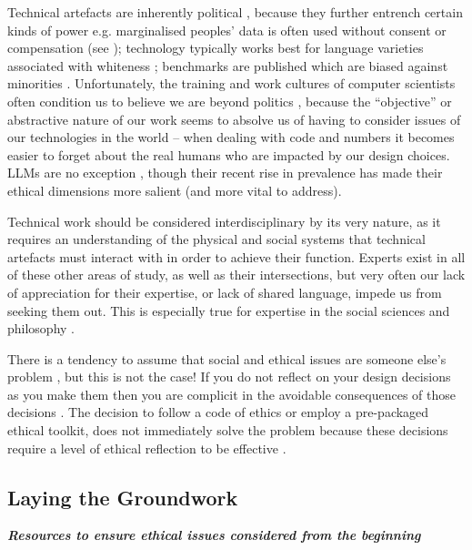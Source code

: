 Technical artefacts are inherently political \cite{winner_artifacts_1980}, because they further entrench certain kinds of power e.g. marginalised peoples' data is often used without consent or compensation (see ); technology typically works best for language varieties associated with whiteness \citep{blodgett_racial_2017}; benchmarks are published which are biased against minorities \citep{buolamwini_gender_2018}. Unfortunately, the training and work cultures of computer scientists often condition us to believe we are beyond politics \citep{malazita2019infrastructures}, because the ``objective'' or abstractive nature of our work seems to absolve us of having to consider issues of our technologies in the world \citep{talat_disembodied_2021} – when dealing with code and numbers it becomes easier to forget about the real humans who are impacted by
our design choices. LLMs are no exception \citep{leidner_ethical_2017}, though their recent rise in prevalence has made their ethical dimensions more salient (and more vital to address). 

Technical work should be considered interdisciplinary by its very nature, as it requires an understanding of the physical and social systems that technical artefacts must interact with in order to achieve their function. Experts exist in all of these other areas of study, as well as their intersections, but very often our lack of appreciation for their expertise, or lack of shared language, impede us from seeking them out. This is especially true for expertise in the social sciences and philosophy \citep{raji2021you, inie_idr_2021, danks2022digital}.  

There is a tendency to assume that social and ethical issues are someone else’s problem \citep{widder2023dislocated}, but this is not the case! If you do not reflect on your design decisions as you make them then you are complicit in the avoidable consequences of those decisions \citep{talat_disembodied_2021}. The decision to follow a code of ethics \cite{mcnamara2018does} or employ a pre-packaged ethical toolkit, does not immediately solve the problem because these decisions require a level of ethical reflection to be effective \citep{wong_seeing_2023}.

\subsection{Laying the Groundwork}\label{subsec:ideation}
\noindent\textbf{\textit{Resources to ensure ethical issues considered from the beginning}}\\

